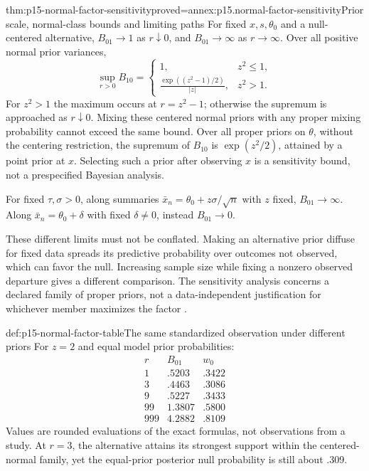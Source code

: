 \begin{hbtheorem}{thm:p15-normal-factor-sensitivity}{proved=annex:p15.normal-factor-sensitivity}{Prior scale, normal-class bounds and limiting paths}
For fixed \(x,s,\theta_0\) and a null-centered alternative,
\(B_{01}\to1\) as \(r\downarrow0\), and \(B_{01}\to\infty\) as
\(r\to\infty\). Over all positive normal prior variances,
\[
 \sup_{r>0} B_{10}=
 \begin{cases}
 1,&z^2\leq1,\\
 \displaystyle\frac{\exp((z^2-1)/2)}{|z|},&z^2>1.
 \end{cases}
\]
For \(z^2>1\) the maximum occurs at \(r=z^2-1\); otherwise the
supremum is approached as \(r\downarrow0\). Mixing these centered normal
priors with any proper mixing probability cannot exceed the same bound.
Over all proper priors on \(\theta\), without the centering restriction,
the supremum of \(B_{10}\) is \(\exp(z^2/2)\), attained by a point prior
at \(x\). Selecting such a prior after observing \(x\) is a sensitivity
bound, not a prespecified Bayesian analysis.

For fixed \(\tau,\sigma>0\), along summaries
\(\bar x_n=\theta_0+z\sigma/\sqrt n\) with \(z\) fixed,
\(B_{01}\to\infty\). Along \(\bar x_n=\theta_0+\delta\) with
fixed \(\delta\ne0\), instead \(B_{01}\to0\).
\end{hbtheorem}

These different limits must not be conflated. Making an alternative prior
diffuse for fixed data spreads its predictive probability over outcomes not
observed, which can favor the null. Increasing sample size while fixing a
nonzero observed departure gives a different comparison. The sensitivity
analysis concerns a declared family of proper priors, not a data-independent
justification for whichever member maximizes the factor
\cite[Secs.~5.1--5.2]{KassRaftery1995BayesFactors}.

\begin{hbexample}{def:p15-normal-factor-table}{The same standardized observation under different priors}
For \(z=2\) and equal model prior probabilities:
\[
\begin{array}{r|rr}
 r& B_{01}&w_0\\\hline
 1&.5203&.3422\\
 3&.4463&.3086\\
 9&.5227&.3433\\
 99&1.3807&.5800\\
 999&4.2882&.8109
\end{array}
\]
Values are rounded evaluations of the exact formulas, not observations
from a study. At \(r=3\), the alternative attains its strongest support
within the centered-normal family, yet the equal-prior posterior null
probability is still about .309.
\end{hbexample}

